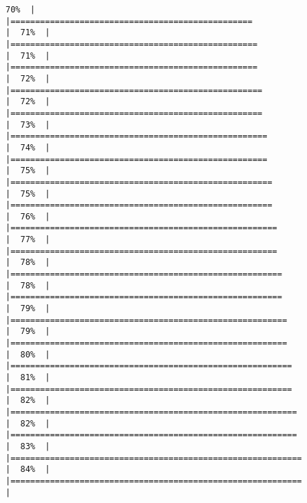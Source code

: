 \documentclass[
]{book}
\begin{document}
\begin{verbatim}
70%  |                                                                              |=================================================                     |  71%  |                                                                              |==================================================                    |  71%  |                                                                              |==================================================                    |  72%  |                                                                              |===================================================                   |  72%  |                                                                              |===================================================                   |  73%  |                                                                              |====================================================                  |  74%  |                                                                              |====================================================                  |  75%  |                                                                              |=====================================================                 |  75%  |                                                                              |=====================================================                 |  76%  |                                                                              |======================================================                |  77%  |                                                                              |======================================================                |  78%  |                                                                              |=======================================================               |  78%  |                                                                              |=======================================================               |  79%  |                                                                              |========================================================              |  79%  |                                                                              |========================================================              |  80%  |                                                                              |=========================================================             |  81%  |                                                                              |=========================================================             |  82%  |                                                                              |==========================================================            |  82%  |                                                                              |==========================================================            |  83%  |                                                                              |===========================================================           |  84%  |                                                                              |===========================================================           |  
\end{verbatim}
\end{document}
